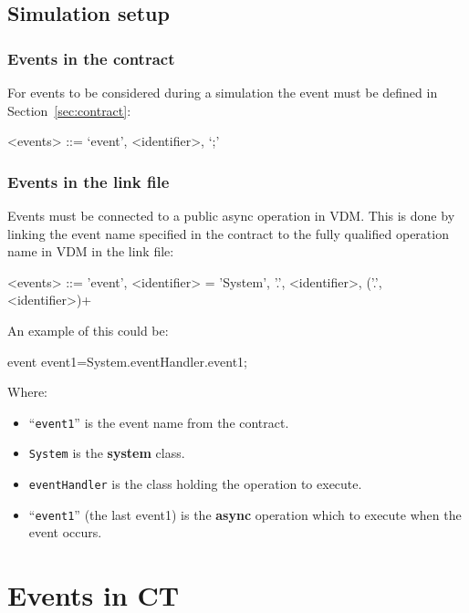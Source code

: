 \documentclass{crescendorepchap}
\newcommand{\vdmkeyw}[1]{{\bf\ttfamily #1}}
\begin{document}
\subsection{Simulation setup}

\subsubsection{Events in the contract}

For events to be considered during a simulation the event must be
defined in Section~\ref{sec:contract}:

\begin{grammar}
<events> ::= `event', <identifier>, `;'
\end{grammar}

\subsubsection{Events in the link file}

Events must be connected to a public async operation in VDM. This is
done by linking the event name specified in the contract to the fully
qualified operation name in VDM in the link file:

\begin{grammar}
<events> ::= 'event', <identifier> = 'System', '.', <identifier>, ('.', <identifier>)+
\end{grammar}

An example of this could be:

\begin{dcl}
event event1=System.eventHandler.event1;
\end{dcl}

Where:

\begin{itemize}
\item
  ``\texttt{event1}'' is the event name from the contract.
\item
  \texttt{System} is the \vdmkeyw{system} class.
\item
  \texttt{eventHandler} is the class holding the operation to execute.
\item
  ``\texttt{event1}'' (the last event1) is the \vdmkeyw{async} operation which to execute
  when the event occurs.
\end{itemize}

\section{Events in CT}
\end{document}
